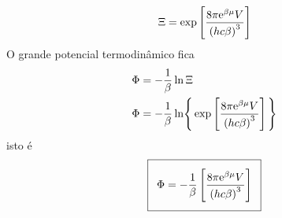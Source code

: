 \begin{prob}
\begin{sol}
\begin{align}
{\begin{gathered}
          \Xi=\exp\left[\frac{8\pi\mathrm{e}^{\beta \mu}V}{\left(hc\beta\right)^3}\right]
        \end{gathered}
      }
    \end{align}
    O grande potencial termodinâmico fica
    \begin{align}
      \begin{split}
        \Phi&=-\frac{1}{\beta}\ln\Xi\\
        \Phi&=-\frac{1}{\beta}\ln\Biggr\{\exp\left[\frac{8\pi\mathrm{e}^{\beta \mu}V}{\left(hc\beta\right)^3}\right]\Biggl\}
      \end{split}
    \end{align}
    isto é
    \begin{align}
      \addtolength{\fboxsep}{5pt}
      \boxed{
        \begin{gathered}
          \Phi=-\frac{1}{\beta}\left[\frac{8\pi\E^{\beta \mu}V}{\left(hc\beta\right)^3}\right]
        \end{gathered}
      }
    \end{align}
  \end{sol}
\end{prob}
